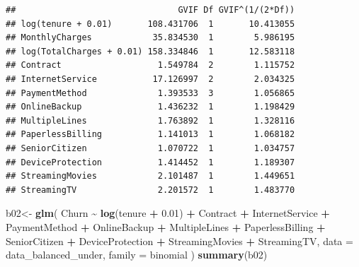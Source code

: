 \documentclass[
  twoside]{article}
\newenvironment{Shaded}{\begin{snugshade}}{\end{snugshade}}
\newcommand{\AttributeTok}[1]{\textcolor[rgb]{0.13,0.29,0.53}{#1}}
\newcommand{\FloatTok}[1]{\textcolor[rgb]{0.00,0.00,0.81}{#1}}
\newcommand{\FunctionTok}[1]{\textcolor[rgb]{0.13,0.29,0.53}{\textbf{#1}}}
\newcommand{\NormalTok}[1]{#1}
\newcommand{\OtherTok}[1]{\textcolor[rgb]{0.56,0.35,0.01}{#1}}
\newcommand{\SpecialCharTok}[1]{\textcolor[rgb]{0.81,0.36,0.00}{\textbf{#1}}}
\begin{document}
\begin{verbatim}
##                                GVIF Df GVIF^(1/(2*Df))
## log(tenure + 0.01)       108.431706  1       10.413055
## MonthlyCharges            35.834530  1        5.986195
## log(TotalCharges + 0.01) 158.334846  1       12.583118
## Contract                   1.549784  2        1.115752
## InternetService           17.126997  2        2.034325
## PaymentMethod              1.393533  3        1.056865
## OnlineBackup               1.436232  1        1.198429
## MultipleLines              1.763892  1        1.328116
## PaperlessBilling           1.141013  1        1.068182
## SeniorCitizen              1.070722  1        1.034757
## DeviceProtection           1.414452  1        1.189307
## StreamingMovies            2.101487  1        1.449651
## StreamingTV                2.201572  1        1.483770
\end{verbatim}

\begin{Shaded}
\begin{Highlighting}[]
\NormalTok{b02}\OtherTok{\textless{}{-}} \FunctionTok{glm}\NormalTok{(}
\NormalTok{  Churn }\SpecialCharTok{\textasciitilde{}} \FunctionTok{log}\NormalTok{(tenure }\SpecialCharTok{+} \FloatTok{0.01}\NormalTok{)}
  \SpecialCharTok{+}\NormalTok{ Contract  }\SpecialCharTok{+}\NormalTok{ InternetService }\SpecialCharTok{+}\NormalTok{ PaymentMethod }
  \SpecialCharTok{+}\NormalTok{ OnlineBackup }\SpecialCharTok{+}\NormalTok{ MultipleLines }\SpecialCharTok{+}\NormalTok{ PaperlessBilling }\SpecialCharTok{+}\NormalTok{ SeniorCitizen  }
  \SpecialCharTok{+}\NormalTok{ DeviceProtection }\SpecialCharTok{+}\NormalTok{ StreamingMovies }\SpecialCharTok{+}\NormalTok{ StreamingTV,}
  \AttributeTok{data =}\NormalTok{ data\_balanced\_under,}
  \AttributeTok{family =}\NormalTok{ binomial}
\NormalTok{)}
\FunctionTok{summary}\NormalTok{(b02)}
\end{Highlighting}
\end{Shaded}
\end{document}
